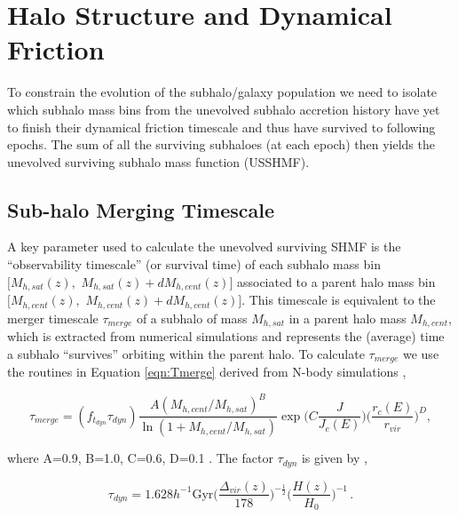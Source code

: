 \section{Halo Structure and Dynamical Friction}

To constrain the evolution of the subhalo/galaxy population we need to isolate which subhalo mass bins from the unevolved subhalo accretion history have yet to finish their dynamical friction timescale and thus have survived to following epochs. The sum of all the surviving subhaloes (at each epoch) then yields the unevolved surviving subhalo mass function (USSHMF). 

\subsection{Sub-halo Merging Timescale}
\label{sec:Timescale}
 A key parameter used to calculate the unevolved surviving SHMF is the ``observability timescale'' (or survival time) of each  subhalo mass bin $[M_{h,sat}(z),$ $M_{h,sat}(z) + dM_{h,cent}(z)]$ associated to a parent halo mass bin $[M_{h,cent}(z),$ $M_{h,cent}(z) + dM_{h,cent}(z)]$. This timescale is equivalent to the merger timescale $\tau_{merge}$ of a subhalo of mass $M_{h,sat}$ in a parent halo mass $M_{h,cent}$, which is extracted from numerical simulations and represents the (average) time a subhalo ``survives'' orbiting within the parent halo. To calculate $\tau_{merge}$ we use the routines in Equation \ref{eqn:Tmerge} derived from N-body simulations \citep{Boylan-Kolchin2008},

\begin{equation}
\label{eqn:Tmerge}
\tau_{merge} =
(f_{t_{dyn}}\tau_{dyn}) \frac{A(M_{h, cent}/M_{h,sat})^B}{\ln(1+M_{h, cent}/M_{h, sat})} \exp \Big(C\frac{J}{J_c(E)}\Big) \Big( \frac{r_c(E)}{r_{vir}} \Big)^D,
\end{equation}

where A=0.9, B=1.0, C=0.6, D=0.1 \citep{McCavana2012TheMergers}. The factor $\tau_{dyn}$ is given by \citep{Jiang2016StatisticsFunctions},

\begin{equation}
\label{eqn:tdyn}
\tau_{dyn} = 1.628 h^{-1} \mathrm{Gyr} \Big(\frac{\Delta_{vir}(z)}{178}\Big)^{-\frac{1}{2}} \Big(\frac{H(z)}{H_0}\Big)^{-1} \, .
\end{equation}

